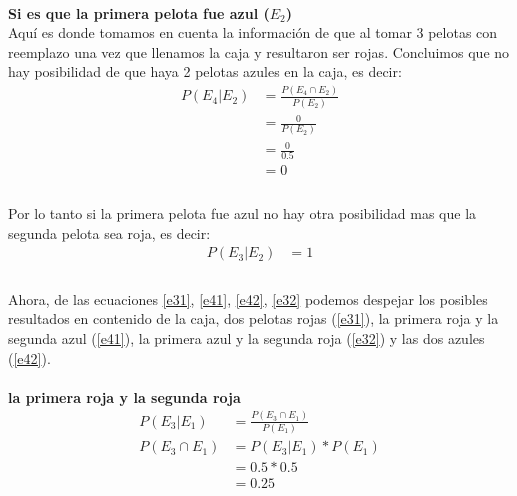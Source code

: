 \documentclass[12pt]{article}
\begin{document}
	  \paragraph{}\textbf{Si es que la primera pelota fue azul ($E_2$)}\\ 
	  Aquí es donde tomamos en cuenta la información de que al tomar 3 pelotas con reemplazo una vez que llenamos la caja y resultaron ser rojas. Concluimos que no hay posibilidad de que haya 2 pelotas azules en la caja, es decir:
	  \begin{equation}\label{e42}
	  \begin{split}
	  P(E_4|E_2) &= \frac{P(E_4 \cap E_2)}{P(E_2)}\\
	  &= \frac{0}{P(E_2)}\\
	  &= \frac{0}{0.5}\\
	  &= 0\\
	  \end{split}
	  \end{equation}\\
	  Por lo tanto si la primera pelota fue azul no hay otra posibilidad mas que la segunda pelota sea roja, es decir:
	  \begin{equation}\label{e32}
	  \begin{split}
	  P(E_3|E_2) &= 1\\
	  \end{split}
	  \end{equation}\\
	 Ahora, de las ecuaciones \ref{e31}, \ref{e41}, \ref{e42}, \ref{e32} podemos despejar los posibles resultados en contenido de la caja, dos pelotas rojas (\ref{e31}), la primera roja y la segunda azul (\ref{e41}), la primera azul y la segunda roja (\ref{e32}) y las dos azules (\ref{e42}).\\
	 \pagebreak
	 \paragraph{}\textbf{la primera roja y la segunda roja}\\
	  \begin{equation}\label{e31in}
	  \begin{split}
	  P(E_3|E_1) &= \frac{P(E_3 \cap E_1)}{P(E_1)}\\
	  P(E_3 \cap E_1) &= P(E_3|E_1) * P(E_1)\\
	  &= 0.5 * 0.5\\
	  &= 0.25\\
	  \end{split}
	  \end{equation}
\end{document}
